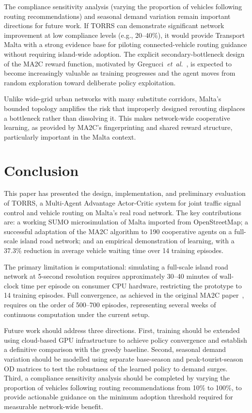\documentclass[conference]{IEEEtran}
\begin{document}
The compliance sensitivity analysis (varying the proportion of vehicles following
routing recommendations) and seasonal demand variation remain important
directions for future work. If TORRS can demonstrate significant network
improvement at low compliance levels (e.g., 20--40\%), it would provide Transport
Malta with a strong evidence base for piloting connected-vehicle routing guidance
without requiring island-wide adoption. The explicit secondary-bottleneck design
of the MA2C reward function, motivated by Gregucci~\textit{et~al.}~\cite{gregucci2023},
is expected to become increasingly valuable as training progresses and the agent
moves from random exploration toward deliberate policy exploitation.

Unlike wide-grid urban networks with many substitute corridors, Malta's bounded
topology amplifies the risk that improperly designed rerouting displaces a
bottleneck rather than dissolving it. This makes network-wide cooperative
learning, as provided by MA2C's fingerprinting and shared reward structure,
particularly important in the Malta context.

\section{Conclusion}

This paper has presented the design, implementation, and preliminary evaluation
of TORRS, a Multi-Agent Advantage Actor-Critic system for joint traffic signal
control and vehicle routing on Malta's real road network. The key contributions
are: a working SUMO microsimulation of Malta imported from OpenStreetMap; a
successful adaptation of the MA2C algorithm to 190 cooperative agents on a
full-scale island road network; and an empirical demonstration of learning, with
a 37.3\% reduction in average vehicle waiting time over 14 training episodes.

The primary limitation is computational: simulating a full-scale island road
network at 5-second resolution requires approximately 30--40 minutes of
wall-clock time per episode on consumer CPU hardware, restricting the prototype
to 14 training episodes. Full convergence, as achieved in the original MA2C
paper~\cite{chu2020}, requires on the order of 500--700 episodes, representing
several weeks of continuous computation under the current setup.

Future work should address three directions. First, training should be extended
using cloud-based GPU infrastructure to achieve policy convergence and establish
a definitive comparison with the greedy baseline. Second, seasonal demand
variation should be modelled using separate base-season and peak-tourist-season
OD matrices to test the robustness of the learned policy to demand surges.
Third, a compliance sensitivity analysis should be completed by varying the
proportion of vehicles following routing recommendations from 10\% to 100\%,
to provide actionable guidance on the minimum adoption threshold required for
measurable network-wide benefit.
\end{document}
